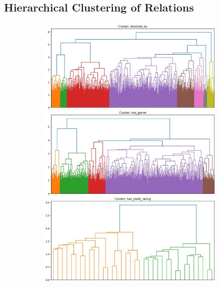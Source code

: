 \documentclass{article}
\begin{document}
\subsection{Hierarchical Clustering of Relations}
\begin{figure}[ht]
    \centering
    \begin{subfigure}[b]{0.3\textwidth}
        \centering
        \includegraphics[width=\textwidth]{HC1.jpeg}
    \end{subfigure}
    \hfill %
    \begin{subfigure}[b]{0.3\textwidth}
        \centering

\end{subfigure}
\end{figure}
\end{document}
